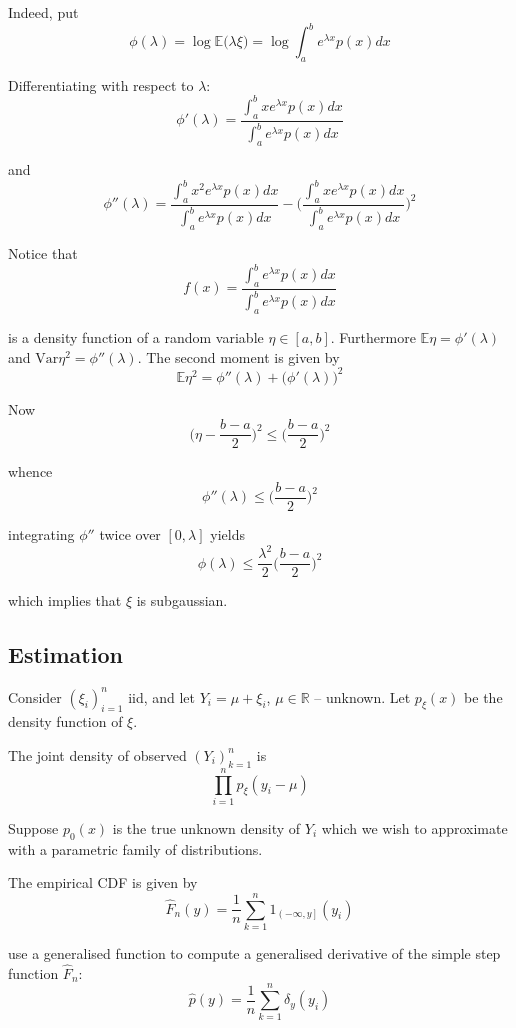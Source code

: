 \documentclass[a4paper]{article}
\newcommand{\clo}[1]{{\left [ #1 \right ]}}
\newcommand{\ploc}[1]{{\left ( #1 \right ]}}
\newcommand{\brac}[1]{{\left ( #1 \right )}}
\newcommand{\Real}{\mathbb{R}}
\newcommand{\Ex}{\mathbb{E}}
\newcommand{\Var}{\text{Var}}
\begin{document}
Indeed, put
\[\phi(\lambda) = \log \Ex\big(\lambda \xi\big) = \log \int_a^b e^{\lambda x} p(x) dx\]

Differentiating with respect to $\lambda$:
\[\phi'(\lambda) = \frac{\int_a^b x e^{\lambda x} p(x) dx}{\int_a^b e^{\lambda x} p(x) dx}\]

and 
\[\phi''(\lambda) = \frac{\int_a^b x^2 e^{\lambda x} p(x) dx}{\int_a^b e^{\lambda x} p(x) dx} - \bigg( \frac{\int_a^b x e^{\lambda x} p(x) dx}{\int_a^b e^{\lambda x} p(x) dx} \bigg)^2\]

Notice that
\[f(x) = \frac{\int_a^b e^{\lambda x} p(x) dx}{\int_a^b e^{\lambda x} p(x) dx}\]

is a density function of a random variable $\eta\in \clo{a,b}$. Furthermore $\Ex \eta = \phi'(\lambda)$ and $\Var \eta^2 = \phi''(\lambda)$. The second moment is given by
\[\Ex \eta^2 = \phi''(\lambda) + \big(\phi'(\lambda)\big)^2\]

Now
\[\bigg(\eta - \frac{b-a}{2}\bigg)^2 \leq \bigg(\frac{b-a}{2}\bigg)^2\]

whence 
\[\phi''(\lambda) \leq \bigg(\frac{b-a}{2}\bigg)^2 \]

integrating $\phi''$ twice over $\clo{0,\lambda}$ yields
\[\phi(\lambda) \leq \frac{\lambda^2}{2}\bigg(\frac{b-a}{2}\bigg)^2\]

which implies that $\xi$ is subgaussian.


\subsection{Estimation} %
\label{sub:estimation}

Consider $\brac{\xi_i}_{i=1}^n$ iid, and let $Y_i = \mu + \xi_i$, $\mu\in \Real$ -- unknown. Let $p_\xi(x)$ be the density function of $\xi$.

The joint density of observed $\brac{Y_i}_{k=1}^n$ is 
\[\prod_{i=1}^n p_\xi(y_i - \mu)\]

Suppose $p_0(x)$ is the true unknown density of $Y_i$ which we wish to approximate with a parametric family of distributions.

The empirical CDF is given by
\[\hat{F}_n(y) = \frac{1}{n}\sum_{k=1}^n 1_{\ploc{-\infty, y}}(y_i)\]

use a generalised function to compute a generalised derivative of the simple step function $\hat{F}_n$:
\[ \hat{p}(y) = \frac{1}{n} \sum_{k=1}^n \delta_y(y_i) \]

\end{document}
